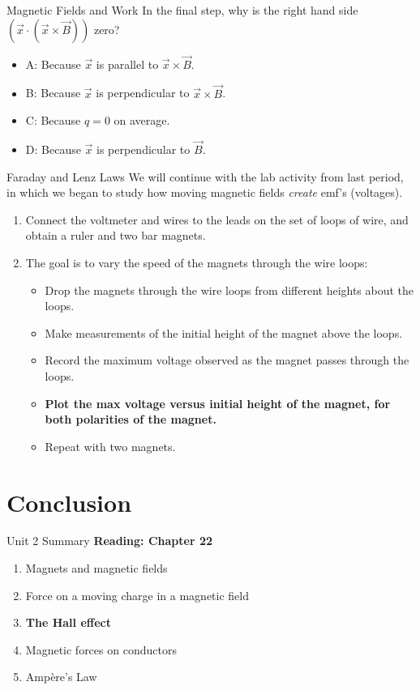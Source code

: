 \documentclass{beamer}
\begin{document}
\begin{frame}{Magnetic Fields and Work}
In the final step, why is the right hand side $\left(\vec{x} \cdot \left( \vec{x} \times \vec{B} \right) \right)$ zero?
\begin{itemize}
\item A: Because $\vec{x}$ is parallel to $\vec{x} \times \vec{B}$.
\item B: Because $\vec{x}$ is perpendicular to $\vec{x} \times \vec{B}$.
\item C: Because $q = 0$ on average.
\item D: Because $\vec{x}$ is perpendicular to $\vec{B}$.
\end{itemize}
\end{frame}

\begin{frame}{Faraday and Lenz Laws}
\small
We will continue with the lab activity from last period, in which we began to study how moving magnetic fields \textit{create} emf's (voltages).
\begin{enumerate}
\item Connect the voltmeter and wires to the leads on the set of loops of wire, and obtain a ruler and two bar magnets.
\item The goal is to vary the speed of the magnets through the wire loops:
\begin{itemize}
\item Drop the magnets through the wire loops from different heights about the loops.
\item Make measurements of the initial height of the magnet above the loops.
\item Record the maximum voltage observed as the magnet passes through the loops.
\item \alert{\textbf{Plot the max voltage versus initial height of the magnet, for both polarities of the magnet.}}
\item Repeat with two magnets.
\end{itemize}
\end{enumerate}
\end{frame}

\section{Conclusion}

\begin{frame}{Unit 2 Summary}
\textbf{Reading: Chapter 22}
\begin{enumerate}
\item Magnets and magnetic fields
\item Force on a moving charge in a magnetic field
\item \textbf{The Hall effect}
\item Magnetic forces on conductors
\item \alert{Amp\`{e}re's Law}
\end{enumerate}
\end{frame}
\end{document}
